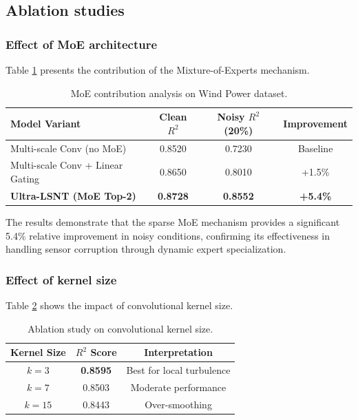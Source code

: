 \documentclass[review,3p,times,draft]{elsarticle}
\begin{document}
\subsection{Ablation studies}
\label{sec:ablation}

\subsubsection{Effect of MoE architecture}
Table \ref{tab:moe_ablation} presents the contribution of the Mixture-of-Experts mechanism.

\begin{table}[htbp]
\centering
\caption{MoE contribution analysis on Wind Power dataset.}
\label{tab:moe_ablation}
\begin{tabular}{@{}lccc@{}}
\toprule
\textbf{Model Variant} & \textbf{Clean $R^2$} & \textbf{Noisy $R^2$ (20\%)} & \textbf{Improvement} \\
\midrule
Multi-scale Conv (no MoE) & 0.8520 & 0.7230 & Baseline \\
Multi-scale Conv + Linear Gating & 0.8650 & 0.8010 & +1.5\% \\
\textbf{Ultra-LSNT (MoE Top-2)} & \textbf{0.8728} & \textbf{0.8552} & \textbf{+5.4\%} \\
\bottomrule
\end{tabular}
\end{table}

The results demonstrate that the sparse MoE mechanism provides a significant 5.4\% relative improvement in noisy conditions, confirming its effectiveness in handling sensor corruption through dynamic expert specialization.

\subsubsection{Effect of kernel size}
Table \ref{tab:ablation_kernel} shows the impact of convolutional kernel size.

\begin{table}[htbp]
\centering
\caption{Ablation study on convolutional kernel size.}
\label{tab:ablation_kernel}
\begin{tabular}{@{}ccc@{}}
\toprule
\textbf{Kernel Size} & \textbf{$R^2$ Score} & \textbf{Interpretation} \\
\midrule
$k=3$ & \textbf{0.8595} & Best for local turbulence \\
$k=7$ & 0.8503 & Moderate performance \\
$k=15$ & 0.8443 & Over-smoothing \\
\bottomrule
\end{tabular}
\end{table}
\end{document}
